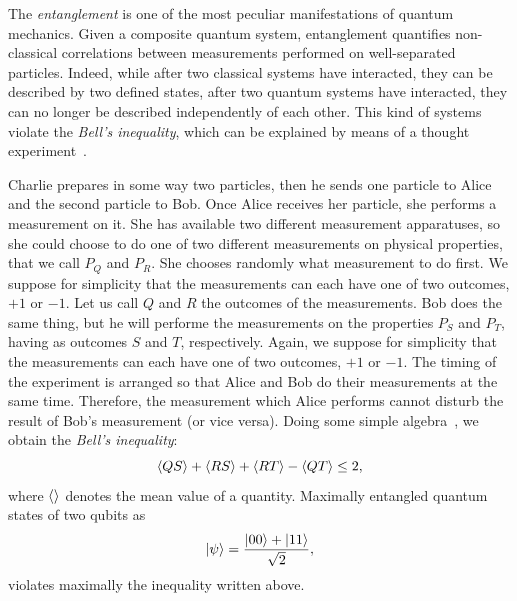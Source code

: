 The \emph{entanglement} is one of the most peculiar manifestations of quantum mechanics. Given a composite quantum system, entanglement quantifies non-classical correlations between measurements performed on well-separated particles. Indeed, while after two classical systems have interacted, they can be described by two defined states, after two quantum systems have interacted, they can no longer be described independently of each other. This kind of systems violate the \emph{Bell's inequality}, which can be explained by means of a thought experiment~\cite{nielsen_chuang}. 

Charlie prepares in some way two particles, then he sends one particle to Alice and the second particle to Bob. Once Alice receives her particle, she performs a measurement on it. She has available two different measurement apparatuses, so she could choose to do one of two different measurements on physical properties, that we call $P_Q$ and $P_R$. She chooses randomly what measurement to do first. We suppose for simplicity that the measurements can each have one of two outcomes, $+1$ or $−1$. Let us call $Q$ and $R$ the outcomes of the measurements. Bob does the same thing, but he will performe the measurements on the properties $P_S$ and $P_T$, having as outcomes $S$ and $T$, respectively. Again, we suppose for simplicity that the measurements can each have one of two outcomes, $+1$ or $−1$. The timing of the experiment is arranged so that Alice and Bob do their measurements at the same time. Therefore, the measurement which Alice performs cannot disturb the result of Bob’s measurement (or vice versa). Doing some simple algebra~\cite{nielsen_chuang}, we obtain the \emph{Bell's inequality}:
\begin{equation*}
    \braket{QS}+\braket{RS}+\braket{RT}-\braket{QT}\leq 2,
\end{equation*}
where $\braket{} $ denotes the mean value of a quantity. 
Maximally entangled quantum states of two qubits as
\begin{equation*}
    \ket{\psi} = \frac{\ket{00}+\ket{11}}{\sqrt{2}},
\end{equation*}
violates maximally the inequality written above. 

